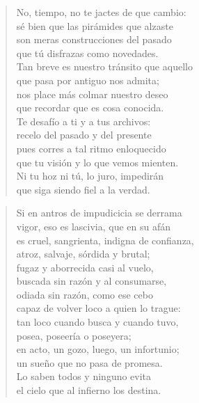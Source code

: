 \documentclass[12pt]{article}
\begin{document}
\clearpage
{}
\begin{verse}

No, tiempo, no te jactes de que cambio:\\
sé bien que las pirámides que alzaste\\
son meras construcciones del pasado\\
que tú disfrazas como novedades.\\
Tan breve es nuestro tránsito que aquello\\
que pasa por antiguo nos admita;\\
nos place más colmar nuestro deseo\\
que recordar que es cosa conocida.\\
Te desafío a ti y a tus archivos:\\
recelo del pasado y del presente\\
pues corres a tal ritmo enloquecido\\
que tu visión y lo que vemos mienten.\\
Ni tu hoz ni tú, lo juro, impedirán\\
que siga siendo fiel a la verdad.

\end{verse}

\clearpage
{}
\begin{verse}

Si en antros de impudicicia se derrama\\
vigor, eso es lascivia, que en su afán\\
es cruel, sangrienta, indigna de confianza,\\
atroz, salvaje, sórdida y brutal;\\
fugaz y aborrecida casi al vuelo,\\
buscada sin razón y al consumarse,\\
odiada sin razón, como ese cebo\\
capaz de volver loco a quien lo trague:\\
tan loco cuando busca y cuando tuvo,\\
posea, poseería o poseyera;\\
en acto, un gozo, luego, un infortunio;\\
un sueño que no pasa de promesa.\\
Lo saben todos y ninguno evita\\
el cielo que al infierno los destina.

\end{verse}
\end{document}
